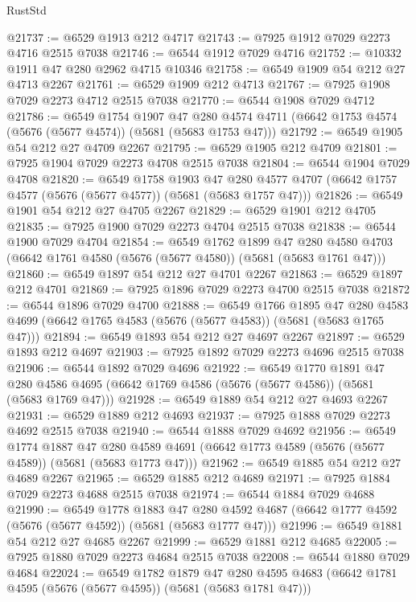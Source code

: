 \begin{lexlean}{RustStd}
\begin{coremodule}
@21737 := @6529 @1913 @212 @4717
@21743 := @7925 @1912 @7029 @2273 @4716 @2515 @7038
@21746 := @6544 @1912 @7029 @4716
@21752 := @10332 @1911 @47 @280 @2962 @4715 @10346
@21758 := @6549 @1909 @54 @212 @27 @4713 @2267
@21761 := @6529 @1909 @212 @4713
@21767 := @7925 @1908 @7029 @2273 @4712 @2515 @7038
@21770 := @6544 @1908 @7029 @4712
@21786 := @6549
    @1754
    @1907
    @47
    @280
    @4574
    @4711
    (@6642 @1753 @4574 (@5676 (@5677 @4574)) (@5681 (@5683 @1753 @47)))
@21792 := @6549 @1905 @54 @212 @27 @4709 @2267
@21795 := @6529 @1905 @212 @4709
@21801 := @7925 @1904 @7029 @2273 @4708 @2515 @7038
@21804 := @6544 @1904 @7029 @4708
@21820 := @6549
    @1758
    @1903
    @47
    @280
    @4577
    @4707
    (@6642 @1757 @4577 (@5676 (@5677 @4577)) (@5681 (@5683 @1757 @47)))
@21826 := @6549 @1901 @54 @212 @27 @4705 @2267
@21829 := @6529 @1901 @212 @4705
@21835 := @7925 @1900 @7029 @2273 @4704 @2515 @7038
@21838 := @6544 @1900 @7029 @4704
@21854 := @6549
    @1762
    @1899
    @47
    @280
    @4580
    @4703
    (@6642 @1761 @4580 (@5676 (@5677 @4580)) (@5681 (@5683 @1761 @47)))
@21860 := @6549 @1897 @54 @212 @27 @4701 @2267
@21863 := @6529 @1897 @212 @4701
@21869 := @7925 @1896 @7029 @2273 @4700 @2515 @7038
@21872 := @6544 @1896 @7029 @4700
@21888 := @6549
    @1766
    @1895
    @47
    @280
    @4583
    @4699
    (@6642 @1765 @4583 (@5676 (@5677 @4583)) (@5681 (@5683 @1765 @47)))
@21894 := @6549 @1893 @54 @212 @27 @4697 @2267
@21897 := @6529 @1893 @212 @4697
@21903 := @7925 @1892 @7029 @2273 @4696 @2515 @7038
@21906 := @6544 @1892 @7029 @4696
@21922 := @6549
    @1770
    @1891
    @47
    @280
    @4586
    @4695
    (@6642 @1769 @4586 (@5676 (@5677 @4586)) (@5681 (@5683 @1769 @47)))
@21928 := @6549 @1889 @54 @212 @27 @4693 @2267
@21931 := @6529 @1889 @212 @4693
@21937 := @7925 @1888 @7029 @2273 @4692 @2515 @7038
@21940 := @6544 @1888 @7029 @4692
@21956 := @6549
    @1774
    @1887
    @47
    @280
    @4589
    @4691
    (@6642 @1773 @4589 (@5676 (@5677 @4589)) (@5681 (@5683 @1773 @47)))
@21962 := @6549 @1885 @54 @212 @27 @4689 @2267
@21965 := @6529 @1885 @212 @4689
@21971 := @7925 @1884 @7029 @2273 @4688 @2515 @7038
@21974 := @6544 @1884 @7029 @4688
@21990 := @6549
    @1778
    @1883
    @47
    @280
    @4592
    @4687
    (@6642 @1777 @4592 (@5676 (@5677 @4592)) (@5681 (@5683 @1777 @47)))
@21996 := @6549 @1881 @54 @212 @27 @4685 @2267
@21999 := @6529 @1881 @212 @4685
@22005 := @7925 @1880 @7029 @2273 @4684 @2515 @7038
@22008 := @6544 @1880 @7029 @4684
@22024 := @6549
    @1782
    @1879
    @47
    @280
    @4595
    @4683
    (@6642 @1781 @4595 (@5676 (@5677 @4595)) (@5681 (@5683 @1781 @47)))

\end{coremodule}
\end{lexlean}
